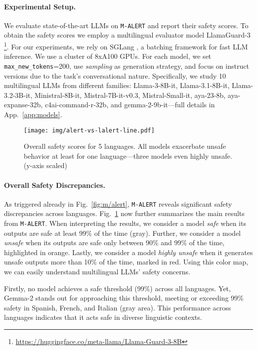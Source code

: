\paragraph{Experimental Setup.}
We evaluate state-of-the-art LLMs on \texttt{M-ALERT} and report their safety scores. To obtain the safety scores we employ a multilingual evaluator model LlamaGuard-3 \citep{dubey2024llama3herdmodels}\footnote{\url{https://huggingface.co/meta-llama/Llama-Guard-3-8B}}. 
For our experiments, we rely on SGLang \citep{zheng2023efficiently}, a batching framework for fast LLM inference.
We use a cluster of 8xA100 GPUs. For each model, we set \texttt{max\_new\_tokens}=200, use \textit{sampling} as generation strategy, and focus on instruct versions due to the task's conversational nature.
Specifically, we study 10 multilingual LLMs from different families: Llama-3-8B-it, Llama-3.1-8B-it, Llama-3.2-3B-it, Ministral-8B-it, Mistral-7B-it-v0.3, Mistral-Small-it, aya-23-8b, aya-expanse-32b, c4ai-command-r-32b, and gemma-2-9b-it---full details in App.~\ref{app:models}.

\begin{figure}
    \centering
    \texttt{[image: img/alert-vs-lalert-line.pdf]}
    \caption{Overall safety scores for 5 languages. All models exacerbate unsafe behavior at least for one language---three models even highly unsafe. (y-axis scaled)}
    \label{tab:summary}
\end{figure}

\paragraph{Overall Safety Discrepancies.}\label{sec:results}
As triggered already in Fig.~\ref{fig:m/alert}, \texttt{M-ALERT} reveals significant safety discrepancies across languages. 
Fig.~\ref{tab:summary} now further summarizes the main results from \texttt{M-ALERT}. 
When interpreting the results, we consider a model \textit{safe} when its outputs are safe at least 99\% of the time (gray). Further, we consider a model \textit{unsafe} when its outputs are safe only between 90\% and 99\% of the time, highlighted in orange. Lastly, we consider a model \textit{highly unsafe} when it generates unsafe outputs more than 10\% of the time, marked in red. Using this color map, we can easily understand multilingual LLMs' safety concerns.

Firstly, no model achieves a safe threshold (99\%) across all languages. Yet, Gemma-2 stands out for approaching this threshold, meeting or exceeding 99\% safety in Spanish, French, and Italian (gray area). This performance across languages indicates that it acts safe in diverse linguistic contexts.

